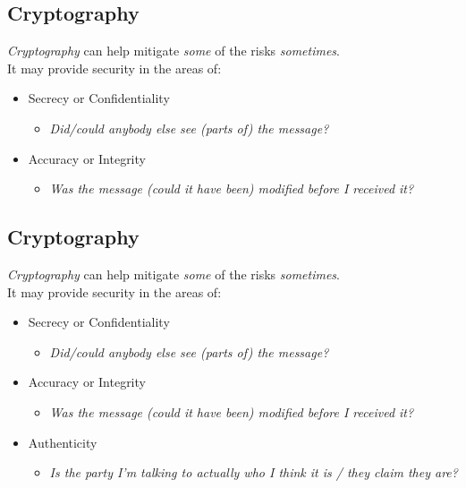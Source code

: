 \documentclass[xga]{xdvislides}
\begin{document}
\subsection{Cryptography}
{\em Cryptography} can help mitigate {\em some} of the risks {\em sometimes}.
\\

It may provide security in the areas of:
\begin{itemize}
	\item Secrecy or Confidentiality
		\begin{itemize}
			\item {\em Did/could anybody else see (parts of) the message?}
		\end{itemize}
	\item Accuracy or Integrity
		\begin{itemize}
			\item {\em Was the message (could it have been) modified before I received it?}
		\end{itemize}
\end{itemize}

\subsection{Cryptography}
{\em Cryptography} can help mitigate {\em some} of the risks {\em sometimes}.
\\

It may provide security in the areas of:
\begin{itemize}
	\item Secrecy or Confidentiality
		\begin{itemize}
			\item {\em Did/could anybody else see (parts of) the message?}
		\end{itemize}
	\item Accuracy or Integrity
		\begin{itemize}
			\item {\em Was the message (could it have been) modified before I received it?}
		\end{itemize}
	\item Authenticity
		\begin{itemize}
			\item {\em Is the party I'm talking to actually
who I think it is / they claim they are?}
		\end{itemize}
\end{itemize}
\end{document}
